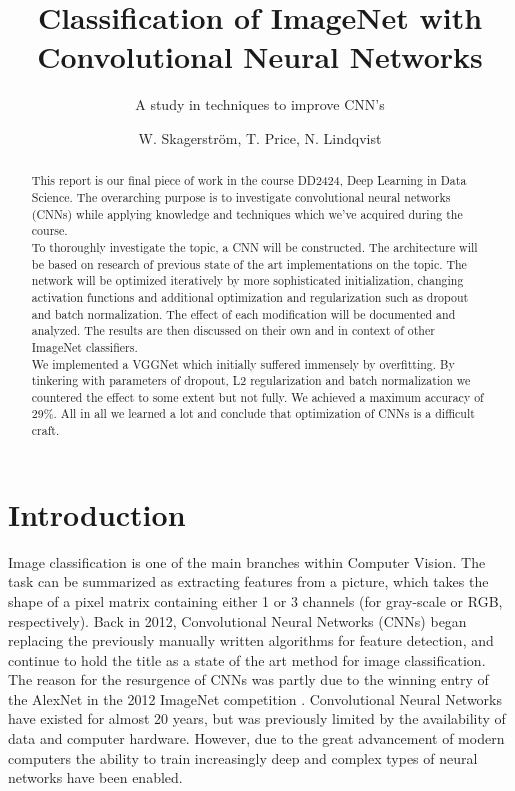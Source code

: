 \documentclass{kthreport}
\title{Classification of ImageNet with Convolutional Neural Networks}
\subtitle{A study in techniques to improve CNN's}
\author{W. Skagerström, T. Price, N. Lindqvist}
\begin{document}
\maketitle
\newpage
\begin{abstract}

\noindent This report is our final piece of work in the course DD2424, Deep Learning in Data Science. The overarching purpose is to investigate convolutional neural networks (CNNs) while applying knowledge and techniques which we've acquired during the course.\\

\noindent To thoroughly investigate the topic, a CNN will be constructed. The architecture will be based on research of previous state of the art implementations on the topic. The network will be optimized iteratively by more sophisticated initialization, changing activation functions and additional optimization and regularization such as dropout and batch normalization. The effect of each modification will be documented and analyzed. The results are then discussed on their own and in context of other ImageNet classifiers.\\

\noindent We implemented a VGGNet which initially suffered immensely by overfitting. By tinkering with parameters of dropout, L2 regularization and batch normalization we countered the effect to some extent but not fully. We achieved a maximum accuracy of 29\%. All in all we learned a lot and conclude that optimization of CNNs is a difficult craft.

\end{abstract}
\newpage

\tableofcontents
\newpage

\section{Introduction}
Image classification is one of the main branches within Computer Vision. The task can be summarized as extracting features from a picture, which takes the shape of a pixel matrix containing either 1 or 3 channels (for gray-scale or RGB, respectively). Back in 2012, Convolutional Neural Networks (CNNs) began replacing the previously manually written algorithms for feature detection, and continue to hold the title as a state of the art method for image classification. The reason for the resurgence of CNNs was partly due to the winning entry of the AlexNet in the 2012 ImageNet competition \cite{krizhevsky2012imagenet}. Convolutional Neural Networks have existed for almost 20 years, but was previously limited by the availability of data and computer hardware. However, due to the great advancement of modern computers the ability to train increasingly deep and complex types of neural networks have been enabled.
\end{document}

